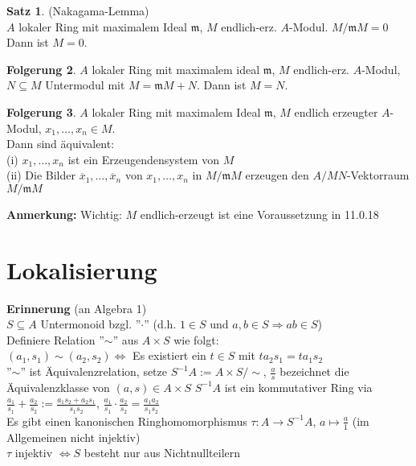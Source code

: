 \documentclass[10pt,a4paper,numbers=endperiod]{scrreprt}
\theoremstyle{definition}
\newtheorem{satz}{Satz}[section]
\newtheorem{folg}[satz]{Folgerung}
\begin{document}
\begin{satz}
	(Nakagama-Lemma)\\
	$A$ lokaler Ring mit maximalem Ideal $\mathfrak{m}$, $M$ endlich-erz. $A$-Modul. $M/\mathfrak{m}M = 0$\\
	Dann ist $M = 0$.
\end{satz}

\begin{folg}
	$A$ lokaler Ring mit maximalem ideal $\mathfrak{m}$, $M$ endlich-erz. $A$-Modul, $N \subseteq M$ Untermodul mit $M = \mathfrak{m}
	M + N$. Dann ist $M = N$.
\end{folg}

\begin{folg}
	$A$ lokaler Ring mit maximalem Ideal $\mathfrak{m}$, $M$ endlich erzeugter $A$-Modul, $x_1,\ldots, x_n \in M$.\\
	Dann sind äquivalent:\\
	(i) $x_1, \ldots, x_n$ ist ein Erzeugendensystem von $M$\\
	(ii) Die Bilder $\overline{x}_1, \ldots, \overline{x}_n$ von $x_1, \ldots, x_n$ in $M/\mathfrak{m}M$ erzeugen den $A/MN$-Vektorraum $M/\mathfrak{m}M$
\end{folg}

\textbf{Anmerkung:} Wichtig: $M$ endlich-erzeugt ist eine Voraussetzung in 11.0.18

\chapter{Lokalisierung} 

\textbf{Erinnerung} (an Algebra 1)\\
$S \subseteq A$ Untermonoid bzgl. ''$\cdot$'' (d.h. $1 \in S$ und $a, b \in S \Rightarrow ab \in S$)\\
Definiere Relation ''$\sim$'' aus $A \times S$ wie folgt:\\
$(a_1, s_1) \sim (a_2, s_2) \Leftrightarrow$ Es existiert ein $t \in S$ mit $ta_2s_1 = ta_1s_2$\\
''$\sim$'' ist Äquivalenzrelation, setze $S^{-1}A := A \times S/\sim$, $\frac{a}{s}$ bezeichnet die Äquivalenzklasse von $(a,s) \in A \times S$ $S^{-1}A$ ist ein kommutativer Ring via $\frac{a_1}{s_1} + \frac{a_2}{s_2} := \frac{a_1s_2 + a_2s_1}{s_1s_2}$, $\frac{a_1}{s_1} \cdot \frac{a_2}{s_2} = \frac{a_1a_2}{s_1s_2}$\\
Es gibt einen kanonischen Ringhomomorphismus $\tau: A \to S^{-1} A$, $a \mapsto \frac{a}{1}$ (im Allgemeinen nicht injektiv)\\
$\tau$ injektiv $\Leftrightarrow S$ besteht nur aus Nichtnullteilern\\
\end{document}
